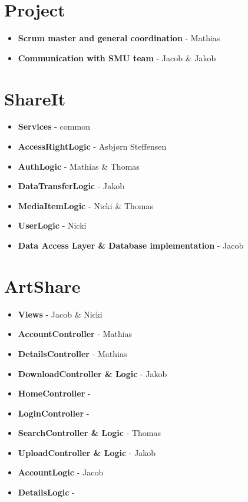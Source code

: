 \section{Project}
\begin{itemize}
\item \textbf{Scrum master and general coordination} - Mathias
\item \textbf{Communication with SMU team} - Jacob \& Jakob
\end{itemize}

\section{ShareIt}
\begin{itemize}
\item \textbf{Services} - common
\item \textbf{AccessRightLogic} - Asbjørn Steffensen
\item \textbf{AuthLogic} - Mathias \& Thomas
\item \textbf{DataTransferLogic} - Jakob
\item \textbf{MediaItemLogic} - Nicki \& Thomas
\item \textbf{UserLogic} - Nicki
\item \textbf{Data Access Layer \& Database implementation} - Jacob
\end{itemize}                   
                                
\section{ArtShare}              
\begin{itemize}                 
\item \textbf{Views} - Jacob \& Nicki
\item \textbf{AccountController} - Mathias
\item \textbf{DetailsController} - Mathias
\item \textbf{DownloadController \& Logic} - Jakob
\item \textbf{HomeController} - 
\item \textbf{LoginController} -
\item \textbf{SearchController \& Logic} - Thomas
\item \textbf{UploadController \& Logic} - Jakob
\item \textbf{AccountLogic} - Jacob
\item \textbf{DetailsLogic} - 
\end{itemize}

